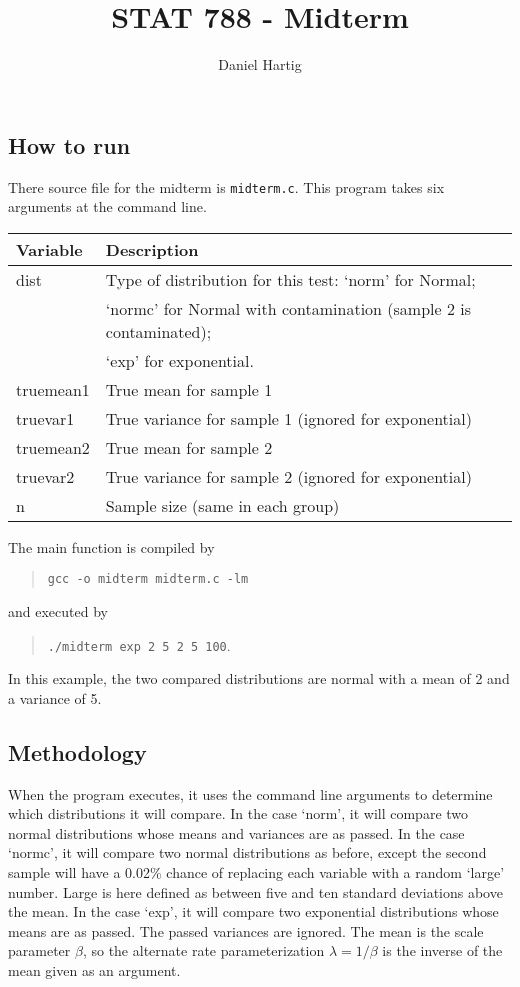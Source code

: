 \documentclass{article}
\title{STAT 788 - Midterm}
\author{Daniel Hartig}
\begin{document}
\maketitle

\subsection*{How to run}

There source file for the midterm is \verb!midterm.c!. This program takes six arguments at the command line.
\begin{center}
\begin{tabular}{ l|l}
\hline
Variable&Description\\
\hline
dist& Type of distribution for this test: `norm' for Normal;\\ &`normc' for Normal with contamination (sample 2 is contaminated);\\&`exp' for exponential.\\
truemean1&True mean for sample 1\\
truevar1&True variance for sample 1 (ignored for exponential)\\
truemean2&True mean for sample 2\\
truevar2&True variance for sample 2 (ignored for exponential)\\
n&Sample size (same in each group)\\
\end{tabular}
\end{center}


The main function is compiled by 
\begin{quote}\verb!gcc -o midterm midterm.c -lm!\end{quote}

and executed by 
\begin{quote}\verb!./midterm exp 2 5 2 5 100!.\end{quote}
In this example, the two compared distributions are normal with a mean of 2 and a variance of 5. 



\subsection*{Methodology}

When the program executes, it uses the command line arguments to determine which distributions it will compare. In the case `norm', it will compare two normal distributions whose means and variances are as passed. In the case `normc', it will compare two normal distributions as before, except the second sample will have a 0.02\% chance of replacing each variable with a random `large' number. Large is here defined as between five and ten standard deviations above the mean. In the case `exp', it will compare two exponential distributions whose means are as passed. The passed  variances are ignored. The mean is the scale parameter $\beta$, so the alternate rate parameterization $\lambda = 1/\beta$ is the inverse of the mean given as an argument.
\end{document}
